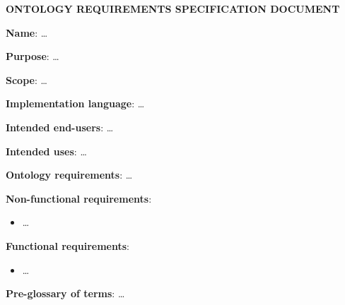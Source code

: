 \begin{mdframed}[linewidth=.6pt]
\setlength{\parindent}{0pt}
\vspace{.4cm}

\MakeUppercase{\textbf{Ontology Requirements Specification Document}}

\vspace{.6cm}

\textbf{Name}: …

\vspace{.3cm}

\textbf{Purpose}: …

\vspace{.3cm}

\textbf{Scope}: …

\vspace{.3cm}

\textbf{Implementation language}: …

\vspace{.3cm}

\textbf{Intended end-users}: …

\vspace{.3cm}

\textbf{Intended uses}: …

\vspace{.3cm}

\textbf{Ontology requirements}: …

\vspace{.3cm}

\setlength{\leftskip}{.5cm}

\textbf{Non-functional requirements}: 

\begin{itemize}
  \item …
\end{itemize}

\textbf{Functional requirements}: 

\begin{itemize}
  \item …
\end{itemize}

\setlength{\leftskip}{0cm}

\vspace{.2cm}

\textbf{Pre-glossary of terms}: …

\setlength{\leftskip}{0cm}

\end{mdframed}


